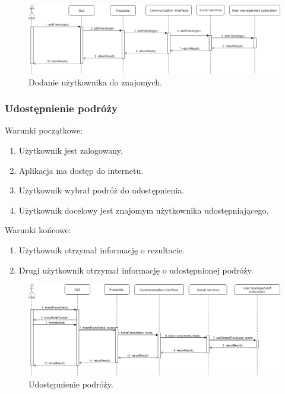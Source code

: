 \documentclass[10pt,twoside,a4paper]{report}
\begin{document}
\noindent\newline
\begin{figure}[h]
\centering
\includegraphics[width=\linewidth]{addFriend}
\caption{Dodanie użytkownika do znajomych.}
\label{fig:addFriend}
\end{figure}
\FloatBarrier
\subsubsection{Udostępnienie podróży}

\noindent Warunki początkowe:
\begin{enumerate}
  \item Użytkownik jest zalogowany.
  \item Aplikacja ma dostęp do internetu.
  \item Użytkownik wybrał podróż do udostępnienia.
  \item Użytkownik docelowy jest znajomym użytkownika udostępniającego.
\end{enumerate}
\par
\noindent\newline
Warunki końcowe:
\begin{enumerate}
  \item Użytkownik otrzymał informację o rezultacie.
  \item Drugi użytkownik otrzymał informację o udostępnionej podróży.
\end{enumerate}

\noindent\newline
\begin{figure}[h]
\centering
\includegraphics[width=\linewidth]{shareTravel}
\caption{Udostępnienie podróży.}
\label{fig:addFriend}
\end{figure}
\end{document}
